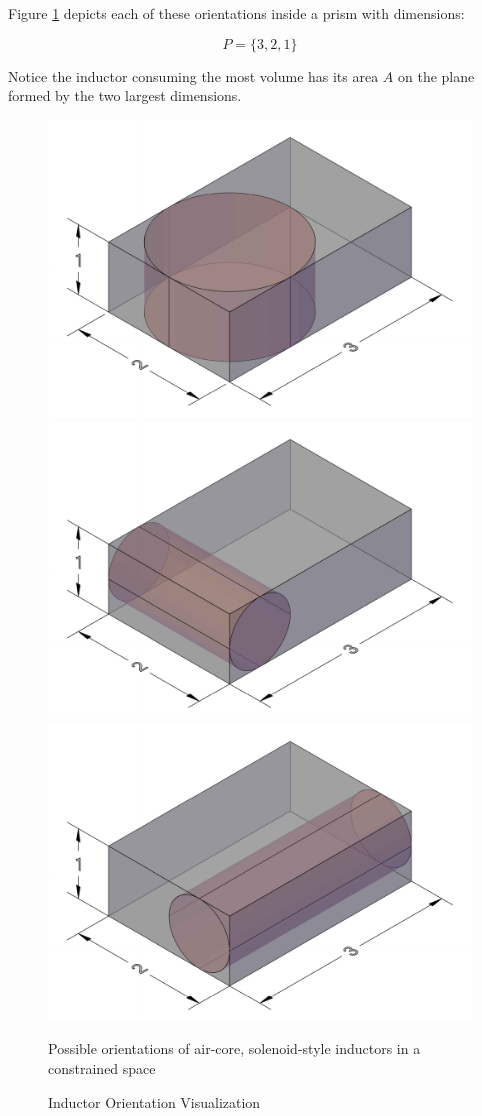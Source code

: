 \documentclass[11pt,oneside]{report}
\begin{document}
    Figure \ref{fig:PossibleOrientations} depicts each of these orientations inside a prism with dimensions:

    \begin{equation}\label{eq:PrismSimulation}
    P = \{3, 2, 1\} \nonumber
    \end{equation}

    Notice the inductor consuming the most volume has its area $A$ on the plane formed by the two largest dimensions.

    \begin{figure}[!htbp]
        \centering
        \includegraphics[width=0.30\linewidth]{img/xyInductorCropped.pdf}
        \includegraphics[width=0.30\linewidth]{img/xzInductorCropped.pdf}
        \includegraphics[width=0.30\linewidth]{img/yzInductorCropped.pdf}
        \caption{Inductor Orientation Visualization}Possible orientations of air-core, solenoid-style inductors in a constrained space
        \label{fig:PossibleOrientations}
    \end{figure}
    
\end{document}
